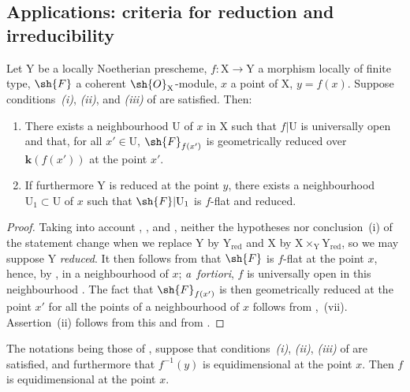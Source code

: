 \subsection{Applications: criteria for reduction and irreducibility}
\label{subsection:IV.15.3}

\begin{proposition}[15.3.1]
\label{IV.15.3.1}
Let $\mathrm{Y}$ be a locally Noetherian prescheme, $f:\mathrm{X}\to\mathrm{Y}$ a morphism locally of finite type, $\sh{F}$ a coherent $\sh{O}_\mathrm{X}$-module, $x$ a point of $\mathrm{X}$, $y=f(x)$.
Suppose conditions~\emph{(i)}, \emph{(ii)}, and \emph{(iii)} of  are satisfied.
Then:
\begin{enumerate}[label=(\roman*)]
  \item There exists a neighbourhood $\mathrm{U}$ of $x$ in $\mathrm{X}$ such that $f|\mathrm{U}$ is universally open and that, for all $x'\in\mathrm{U}$, $\sh{F}_{f(x')}$ is geometrically reduced over $\mathbf{k}(f(x'))$ at the point $x'$.
  \item If furthermore $\mathrm{Y}$ is reduced at the point $y$, there exists a neighbourhood $\mathrm{U}_1\subset\mathrm{U}$ of $x$ such that $\sh{F}|\mathrm{U}_1$ is $f$-flat and reduced.
\end{enumerate}
\end{proposition}

\begin{proof}
\label{IV.15.3.1-proof}
Taking into account , , and , neither the hypotheses nor conclusion~(i) of the statement change when we replace $\mathrm{Y}$ by $\mathrm{Y}_\mathrm{red}$ and $\mathrm{X}$ by $\mathrm{X}\times_\mathrm{Y}\mathrm{Y}_\mathrm{red}$, so we may suppose $\mathrm{Y}$ \emph{reduced}.
It then follows from  that $\sh{F}$ is $f$-flat at the point $x$, hence, by , in a neighbourhood of $x$; \emph{a~fortiori}, $f$ is universally open in this neighbourhood .
The fact that $\sh{F}_{f(x')}$ is then geometrically reduced at the point $x'$ for all the points of a neighbourhood of $x$ follows from ,~(vii).
Assertion~(ii) follows from this and from .
\end{proof}

\begin{proposition}[15.3.2]
\label{IV.15.3.2}
The notations being those of , suppose that conditions~\emph{(i)}, \emph{(ii)}, \emph{(iii)} of  are satisfied, and furthermore that $f^{-1}(y)$ is equidimensional at the point $x$.
Then $f$ is equidimensional at the point $x$.
\end{proposition}

